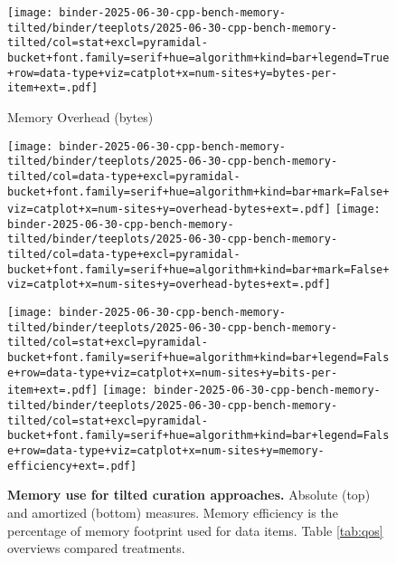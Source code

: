 \begin{figure}


\centering
\texttt{[image: binder-2025-06-30-cpp-bench-memory-tilted/binder/teeplots/2025-06-30-cpp-bench-memory-tilted/col=stat+excl=pyramidal-bucket+font.family=serif+hue=algorithm+kind=bar+legend=True+row=data-type+viz=catplot+x=num-sites+y=bytes-per-item+ext=.pdf]}

\vspace{1ex}

{\small Memory Overhead (bytes)\phantom{422}}

\vspace{1ex}

\hspace{-1ex}%
\texttt{[image: binder-2025-06-30-cpp-bench-memory-tilted/binder/teeplots/2025-06-30-cpp-bench-memory-tilted/col=data-type+excl=pyramidal-bucket+font.family=serif+hue=algorithm+kind=bar+mark=False+viz=catplot+x=num-sites+y=overhead-bytes+ext=.pdf]}%
\hspace{-0.5ex}%
\texttt{[image: binder-2025-06-30-cpp-bench-memory-tilted/binder/teeplots/2025-06-30-cpp-bench-memory-tilted/col=data-type+excl=pyramidal-bucket+font.family=serif+hue=algorithm+kind=bar+mark=False+viz=catplot+x=num-sites+y=overhead-bytes+ext=.pdf]}

\vspace{1.1ex}

\texttt{[image: binder-2025-06-30-cpp-bench-memory-tilted/binder/teeplots/2025-06-30-cpp-bench-memory-tilted/col=stat+excl=pyramidal-bucket+font.family=serif+hue=algorithm+kind=bar+legend=False+row=data-type+viz=catplot+x=num-sites+y=bits-per-item+ext=.pdf]}%
\texttt{[image: binder-2025-06-30-cpp-bench-memory-tilted/binder/teeplots/2025-06-30-cpp-bench-memory-tilted/col=stat+excl=pyramidal-bucket+font.family=serif+hue=algorithm+kind=bar+legend=False+row=data-type+viz=catplot+x=num-sites+y=memory-efficiency+ext=.pdf]}

\vspace{-2ex}

\caption{%
\textbf{Memory use for tilted curation approaches.}
\small
Absolute (top) and amortized (bottom) measures.
Memory efficiency is the percentage of memory footprint used for data items.
Table \ref{tab:qos} overviews compared treatments.
}
\label{fig:memory}
\end{figure}
